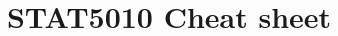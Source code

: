 \documentclass[a4paper, 10pt]{article}
\title{STAT5010 Cheat sheet}
\begin{document}
\scriptsize

\pagestyle{empty}
\setlength{\abovedisplayskip}{3pt}
\setlength{\belowdisplayskip}{2pt}

\begin{multicols*}{3}
    
\end{multicols*}
\end{document}
